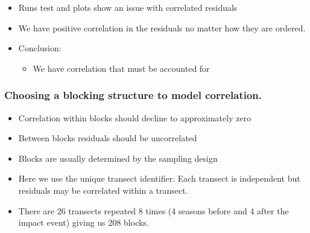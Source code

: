 \begin{frame}
\begin{itemize}
\item Runs test and plots show an issue with correlated residuals
\item We have positive correlation in the residuals no matter how they are ordered.
\pause
\item Conclusion:  
\begin{itemize}
  \item We have correlation that must be accounted for
\end{itemize}
\end{itemize}
\end{frame}

\begin{frame}
\frametitle{Choosing a blocking structure to model correlation.}
\begin{itemize}
\item Correlation within blocks should decline to approximately zero 
\item Between blocks residuals should be uncorrelated
\item Blocks are usually determined by the sampling design
\item Here we use the unique transect identifier: Each transect is independent but residuals may be correlated within a transect.
\item There are 26 transects repeated 8 times (4 seasons before and 4 after the impact event) giving us 208 blocks.
\end{itemize}
\end{frame}


